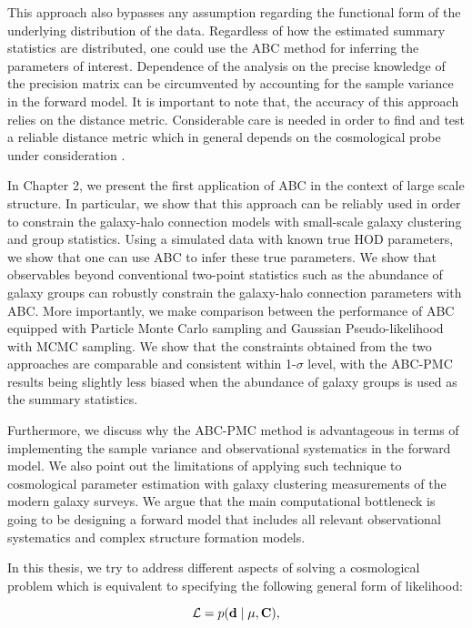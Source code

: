 This approach also bypasses any assumption regarding the functional form of the underlying distribution of the data. Regardless of how the estimated summary statistics are 
distributed, one could use the ABC method for inferring the parameters of interest.
Dependence of the analysis on the precise knowledge of the precision matrix can be circumvented by accounting for the sample variance 
in the forward model. It is important to note that, the accuracy of this approach relies on the distance metric. Considerable care is needed in order to find and test a reliable distance metric which in general depends on the cosmological probe under consideration \citep{abcsn,abcwl,jennings2016a,jennings2016b}. 

In Chapter 2, we present the first application of ABC in the context of large scale structure. In particular, we show that this approach can be reliably used in order to constrain 
the galaxy-halo connection models with small-scale galaxy clustering and group statistics. Using a simulated data with known true HOD parameters, we show that one can use ABC to infer these true parameters. We show that observables beyond conventional two-point statistics such as the abundance of galaxy groups can robustly constrain the galaxy-halo connection parameters with ABC. More importantly, we make comparison between the performance of ABC equipped with Particle Monte Carlo sampling and Gaussian Pseudo-likelihood with MCMC sampling. We show that the constraints obtained from the two approaches are comparable and consistent within 1-$\sigma$ level, with the ABC-PMC results being slightly less 
biased when the abundance of galaxy groups is used as the summary statistics. 

Furthermore, we discuss why the ABC-PMC method is advantageous in terms of implementing the sample variance and observational systematics in the forward model.
We also point out the limitations of applying such technique to cosmological parameter estimation with galaxy clustering measurements of the modern galaxy surveys. 
We argue that the main computational bottleneck is going to be designing a forward model that includes all relevant observational systematics and complex structure formation models. 

In this thesis, we try to address different aspects of solving a cosmological problem which is equivalent to specifying the following general form of likelihood:

\begin{equation}
\mathcal{L} = p(\mathbf{d} \; | \; \bf{\mu} , \mathbf{C}),
\end{equation}

